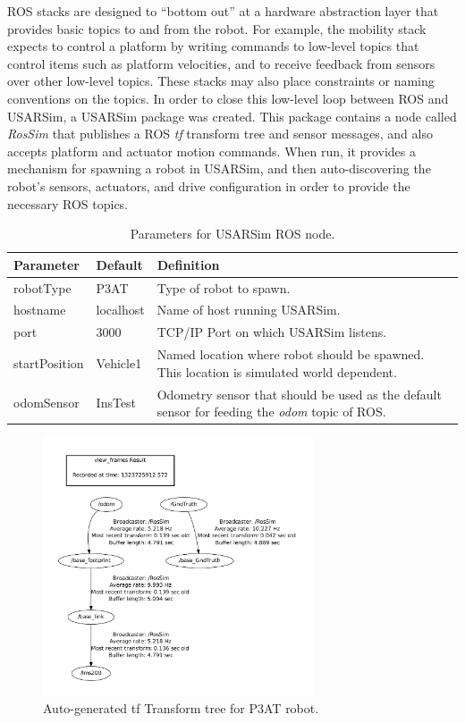 ROS stacks are designed to ``bottom out'' at a hardware abstraction layer that provides basic topics to and from the robot. For example, the mobility stack expects to control a platform by writing commands to low-level topics that control items such as platform velocities, and to receive feedback from sensors over other low-level topics. These stacks may also place constraints or naming conventions on the topics.  In order to close this low-level loop between ROS and USARSim, a USARSim package was created. This package contains a node called {\it RosSim} that publishes a ROS {\it tf} transform tree and sensor messages, and also accepts platform and actuator motion commands. When run, it provides a mechanism for spawning a robot in USARSim, and then auto-discovering the robot's sensors, actuators, and drive configuration in order to provide the necessary ROS topics. 
 \begin{table}[t!]
    \begin{center}
    \small{
    \begin{tabular}{ | l | l | p{4cm} |}
    \hline
    Parameter & Default & Definition \\ \hline
   robotType & P3AT & Type of robot to spawn. \\ \hline
   hostname & localhost & Name of host running USARSim. \\ \hline
   port & 3000 & TCP/IP Port on which USARSim listens. \\ \hline
   startPosition & Vehicle1 & Named location where robot should be spawned. This location is simulated world dependent. \\ \hline
   odomSensor & InsTest & Odometry sensor that should be used as the default sensor for feeding the {\it odom} topic of ROS.\\ \hline
    \end{tabular}
   }
    \caption{Parameters for USARSim ROS node.}
    \label{Table:USARSimNode}
    \end{center}
\end{table}
\begin{figure}[t!]
\centering
\includegraphics[width=8cm]{Figures/ROS/P3ATFrames.pdf}
\caption{Auto-generated tf Transform tree for P3AT robot.}
\label{Fig:P3ATTransformTree}
\end{figure}


